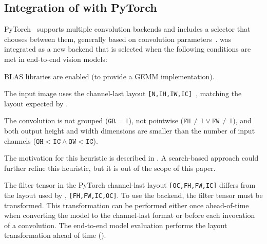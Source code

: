\subsection{Integration of \algname with PyTorch}
\label{sec:pytorch-integration}

PyTorch~\cite{pytorch2024} supports multiple convolution backends and includes a selector that chooses between them, generally based on convolution parameters~\cite{adversarial-linear-algebra-backends2025}.
\algname was integrated as a new backend that is selected when the following conditions are met in end-to-end vision models:
\begin{enumerate*}[label=(\roman*)] 
    \item BLAS libraries are enabled (to provide a GEMM implementation).
    \item The input image uses the channel-last layout \texttt{[N,IH,IW,IC]}~\cite{pytorchChannelLast}, matching the layout expected by \algname.
    \item The convolution is not grouped ($\texttt{GR} = 1$), not pointwise ($\texttt{FH} \neq 1 \lor \texttt{FW} \neq 1$), and both output height and width dimensions are smaller than the number of input channels ($\texttt{OH} < \texttt{IC} \land \texttt{OW} < \texttt{IC}$).
\end{enumerate*}
The motivation for this heuristic is described in .
A search-based approach could further refine this heuristic, but it is out of the scope of this paper.

The filter tensor in the PyTorch channel-last layout \texttt{[OC,FH,FW,IC]} differs from the layout used by \algname, \texttt{[FH,FW,IC,OC]}.
To use the \algname backend, the filter tensor must be transformed.
This transformation can be performed either once ahead-of-time when converting the model to the channel-last format or before each invocation of a \algname convolution.
The end-to-end model evaluation performs the layout transformation ahead of time ().